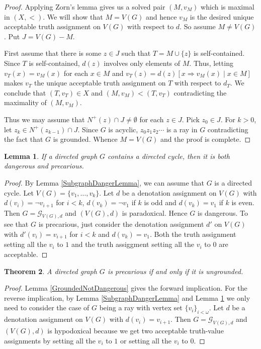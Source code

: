\documentclass[12pt]{kluwer}
\newtheorem{thm}{Theorem}
\newtheorem{lem}[thm]{Lemma}
\theoremstyle{remark}
\newcommand{\fancy}[1]{\mathcal{#1}}
\def\G{\fancy{G}}
\begin{document}
\begin{proof}
Applying Zorn's lemma gives us a solved pair $(M, v_M)$ which is maximal in $(X, <)$.  We will show that $M = V(G)$ and hence $v_M$ is the desired unique acceptable truth assignment on $V(G)$ with respect to $d$.  So assume $M \neq V(G)$.  Put $J = V(G) - M$.\newline

First assume that there is some $z \in J$ such that $T = M \cup \{z\}$ is self-contained.  Since $T$ is self-contained, $d(z)$ involves only elements of $M$.  Thus, letting $v_T(x) = v_M(x)$ for each $x \in M$ and $v_T(z) = d(z)[x \Rightarrow v_M(x) \mid x \in M]$ makes $v_T$ the unique acceptable truth assignment on $T$ with respect to $d_T$.  We conclude that $(T, v_T) \in X$ and $(M, v_M) < (T, v_T)$ contradicting the maximality of $(M, v_M)$.\newline

Thus we may assume that $N^+(z) \cap J \neq \emptyset$ for each $z \in J$.  Pick $z_0 \in J$.  For $k > 0$, let $z_k \in N^+(z_{k - 1}) \cap J$.  Since $G$ is acyclic, $z_0z_1z_2\cdots$ is a ray in $G$ contradicting the fact that $G$ is grounded.  Whence $M = V(G)$ and the proof is complete.
\end{proof}

\begin{lem}\label{DirectedCyclesMakeDanger}
If a directed graph $G$ contains a directed cycle, then it is both dangerous and precarious.
\end{lem}
\begin{proof}
By Lemma \ref{SubgraphDangerLemma}, we can assume that $G$ is a directed cycle.  Let $V(G) = \{v_1, \ldots, v_k\}$.  Let $d$ be a denotation assignment on $V(G)$ with $d(v_i) = \neg v_{i + 1}$ for $i < k$, $d(v_k) = \neg v_1$ if $k$ is odd and $d(v_k) = v_1$ if $k$ is even.  Then $G = \G_{V(G), d}$ and $(V(G), d)$ is paradoxical.  Hence $G$ is dangerous.  To see that $G$ is precarious, just consider the denotation assignment $d'$ on $V(G)$ with $d'(v_i) = v_{i + 1}$ for $i < k$ and $d(v_k) = v_1$.  Both the truth assignment setting all the $v_i$ to $1$ and the truth assiggment setting all the $v_i$ to $0$ are acceptable.
\end{proof}

\begin{thm}\label{PrecariousCharacterization}
A directed graph $G$ is precarious if and only if it is ungrounded.
\end{thm}
\begin{proof}
Lemma \ref{GroundedNotDangerous} gives the forward implication.  For the reverse implication, by Lemma \ref{SubgraphDangerLemma} and Lemma \ref{DirectedCyclesMakeDanger} we only need to consider the case of $G$ being a ray with vertex set $\{v_i\}_{i < \omega}$.  Let $d$ be a denotation assignment on $V(G)$ with $d(v_i) = v_{i+1}$.  Then $G = \G_{V(G), d}$ and $(V(G), d)$ is hypodoxical because we get two acceptable truth-value assignments by setting all the $v_i$ to $1$ or setting all the $v_i$ to $0$.
\end{proof}
\end{document}
